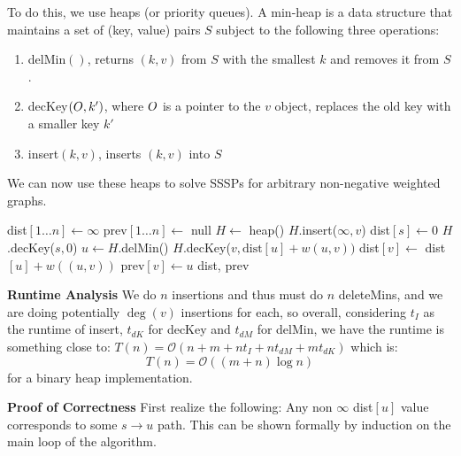 To do this, we use heaps (or priority queues). A min-heap is a data structure that maintains a set of (key, value) pairs $S$ subject to the following
three operations:
\begin{enumerate}
    \item delMin$()$, returns $(k, v)$ from $S$ with the smallest $k$ and removes it from $S$.
    \item decKey$(\*O, k')$, where $\*O$ is a pointer to the $v$ object, replaces the old key with a smaller key $k'$
    \item insert$(k, v)$, inserts $(k, v)$ into $S$
\end{enumerate}

We can now use these heaps to solve SSSPs for arbitrary non-negative weighted graphs.
\begin{algothm}
    \begin{algorithmic}
            \State dist$[1\dots n] \gets \infty$
            \State prev$[1\dots n] \gets$ null
            \State $H \gets$ heap()
                \State $H$.insert($\infty, v$)
            \EndFor
            \State dist$[s] \gets 0$
            \State $H$.decKey($s, 0$)
                \State $u \gets H$.delMin()
                        \State $H$.decKey($v, \text{dist}[u] + w(u, v))$
                        \State dist$[v] \gets$ dist$[u] + w((u, v))$
                        \State prev$[v] \gets u$
                    \EndIf
                \EndFor
            \EndWhile
            \State \Return dist, prev
        \EndFunction
    \end{algorithmic}

    \textbf{Runtime Analysis}
    We do $n$ insertions and thus must do $n$ deleteMins, and we are doing potentially $\deg(v)$ insertions for each, so overall, considering $t_I$ as the runtime of insert,
    $t_{dK}$ for decKey and $t_{dM}$ for delMin, we have the runtime is something close to:
    $T(n) = \mathcal{O}(n + m + nt_I + nt_{dM} + mt_{dK})$ which is:
    \[ T(n)  = \mathcal{O}((m + n) \log n) \]
    for a binary heap implementation.

    \textbf{Proof of Correctness}
    First realize the following: Any non $\infty$ dist$[u]$ value corresponds to some $s \to u$ path. This can be shown formally
    by induction on the main loop of the algorithm.


\end{algothm}
